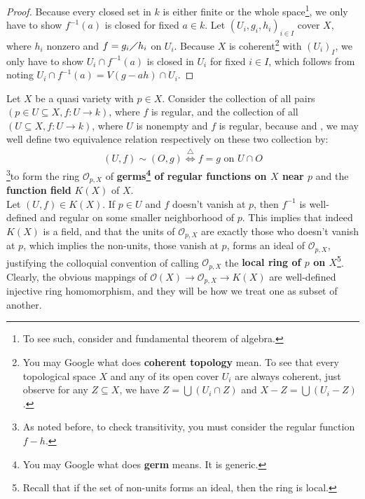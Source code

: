 \documentclass{report}
\begin{document}
\begin{proof}
Because every closed set in $k$ is either finite or the whole space\footnote{To see such, consider  and fundamental theorem of algebra.}, we only have to show $f^{-1}(a)$ is closed for fixed $a \in k$. Let $(U_i,g_i,h_i)_{i \in I}$ cover $X$, where $h_i$ nonzero and $f=g_i\diagup h_i$ on $U_i$. Because $X$ is coherent\footnote{You may Google what does \textbf{coherent topology} mean. To see that every topological space $X$ and any of its open cover $U_i$ are always coherent, just observe for any $Z\subseteq X$, we have $Z = \bigcup (U_i\cap Z) $ and $X-Z= \bigcup (U_i -Z)$.} with  $(U_i)_I$, we only have to show $U_i\cap f^{-1}(a)$ is closed in $U_i$ for fixed $i\in I$, which follows from noting $U_i\cap f^{-1}(a)=V(g-ah)\cap U_i$. 
\end{proof}

Let $X$ be a quasi variety with $p \in X$. Consider the collection of all pairs $(p \in U\subseteq X,f:U\rightarrow k)$, where $f$ is regular, and the collection of all $(U\subseteq X,f:U\rightarrow k)$, where $U$ is nonempty and  $f$ is regular, because  and , we may well define two equivalence relation respectively on these two collection by: 
\begin{align}
(U,f)\sim (O,g)\overset{\triangle}{\iff }f=g\text{ on }U \cap O \label{UCO}
\end{align}
\footnote{As noted before, to check transitivity, you must consider the regular function $f-h$.}to form the ring $\mathscr{O}_{p,X}$ of \textbf{germs\footnote{You may Google what does \textbf{germ} means. It is generic.} of regular functions on $X$ near $p$} and the \textbf{function field} $K(X)$ of $X$.\\ 

Let $(U,f)\in K(X)$. If $p \in U$ and $f$ doesn't vanish at $p$, then $f^{-1}$ is well-defined and regular on some smaller neighborhood of $p$. This implies that indeed $K(X)$ is a field, and that the units of $\mathscr{O}_{p,X}$ are exactly those who doesn't vanish at $p$, which implies the non-units, those vanish at  $p$, forms an ideal of $\mathscr{O}_{p,X}$, justifying the colloquial convention of calling $\mathscr{O}_{p,X}$ the \textbf{local ring of $p$ on $X$}\footnote{Recall that if the set of non-units forms an ideal, then the ring is local.}. Clearly, the obvious mappings of $\mathscr{O}(X)\longrightarrow \mathscr{O}_{p,X}\longrightarrow K(X)$ are well-defined injective ring homomorphism, and they will be how we treat one as subset of another.\label{sam2}  \\
\end{document}
